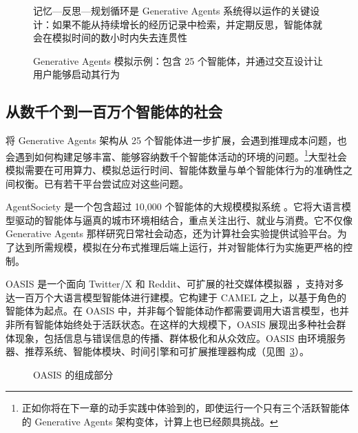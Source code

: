 \begin{figure}
  \begin{center}
    
    \caption{记忆—反思—规划循环是 Generative Agents 系统得以运作的关键设计：如果不能从持续增长的经历记录中检索，并定期反思，智能体就会在模拟时间的数小时内失去连贯性 \citep{park2023generative}}\label{fig:simulacra1}
  \end{center}
\end{figure}

\begin{figure}
  \begin{center}
    
    \caption{Generative Agents 模拟示例：包含 25 个智能体，并通过交互设计让用户能够启动其行为 \citep{park2023generative}}\label{fig:simulacra2}
  \end{center}
\end{figure}

\subsection{从数千个到一百万个智能体的社会}
将 Generative Agents 架构从 25 个智能体进一步扩展，会遇到推理成本问题，也会遇到如何构建足够丰富、能够容纳数千个智能体活动的环境的问题。\footnote{正如你将在下一章的动手实践中体验到的，即使运行一个只有三个活跃智能体的 Generative Agents 架构变体，计算上也已经颇具挑战。}大型社会模拟需要在可用算力、模拟总运行时间、智能体数量与单个智能体行为的准确性之间权衡。已有若干平台尝试应对这些问题。

AgentSociety 是一个包含超过 10,000 个智能体的大规模模拟系统 \citep{piao2025agentsociety}。它将大语言模型驱动的智能体与逼真的城市环境相结合，重点关注出行、就业与消费。它不仅像 Generative Agents 那样研究日常社会动态，还为计算社会实验提供试验平台。为了达到所需规模，模拟在分布式推理后端上运行，并对智能体行为实施更严格的控制。

OASIS 是一个面向 Twitter/X 和 Reddit、可扩展的社交媒体模拟器 \citep{yang2024oasis}，支持对多达一百万个大语言模型智能体进行建模。它构建于 CAMEL \citep{li2023camel} 之上，以基于角色的智能体为起点。在 OASIS 中，并非每个智能体动作都需要调用大语言模型，也并非所有智能体始终处于活跃状态。在这样的大规模下，OASIS 展现出多种社会群体现象，包括信息与错误信息的传播、群体极化和从众效应。OASIS 由环境服务器、推荐系统、智能体模块、时间引擎和可扩展推理器构成（见图~\ref{fig:oasis}）。

\begin{figure}
  \begin{center}
    
    \caption{OASIS 的组成部分 \citep{yang2024oasis}}\label{fig:oasis}
  \end{center}
\end{figure}

